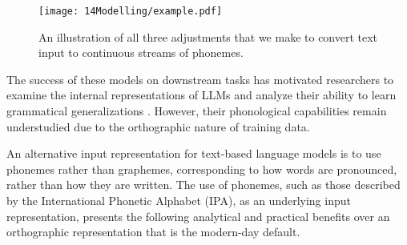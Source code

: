 \begin{figure}[t]
    \centering
    \texttt{[image: 14Modelling/example.pdf]}
    \caption{An illustration of all three adjustments that we make to convert text input to continuous streams of phonemes.}
    \label{fig:example}
    \vspace{-6mm}
\end{figure}



The success of these models on downstream tasks has motivated researchers to examine the internal representations of LLMs and analyze their ability to learn grammatical generalizations \citep{hewitt-manning-2019-structural, hu-etal-2020-systematic, manning-2020-emergent}. However, their phonological capabilities remain understudied due to the orthographic nature of training data.



An alternative input representation for text-based language models is to use phonemes rather than graphemes, corresponding to how words are pronounced, rather than how they are written. The use of phonemes, such as those described by the International Phonetic Alphabet (IPA), as an underlying input representation, presents the following analytical and practical benefits over an orthographic representation that is the modern-day default.

